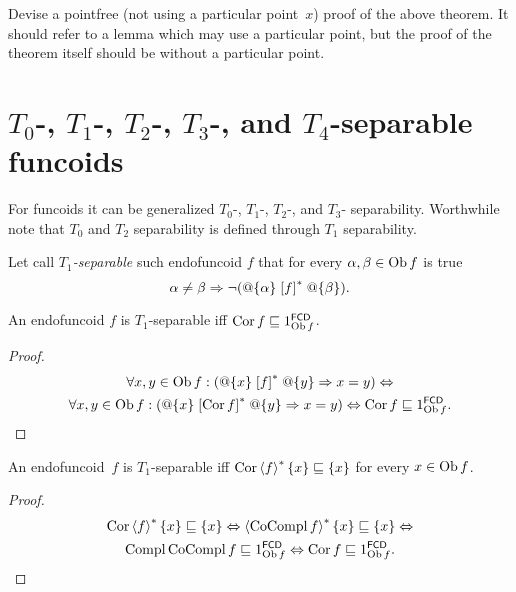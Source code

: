 \begin{problem}
Devise a pointfree (not using a particular point~$x$) proof of the above theorem.
It should refer to a lemma which may use a particular point, but the proof of the
theorem itself should be without a particular point.
\end{problem}

\section{\texorpdfstring{$T_{0}$-, $T_{1}$-, $T_{2}$-, $T_{3}$-, and $T_{4}$-separable
funcoids}%
{T0-, T1-, T2-, and T3-separable funcoids}}

For funcoids it can be generalized $T_{0}$-,
$T_{1}$-, $T_{2}$-, and $T_{3}$- separability. Worthwhile note
that $T_{0}$ and $T_{2}$ separability is defined through $T_{1}$
separability.
\begin{defn}
Let call \emph{$T_{1}$-separable} such endofuncoid $f$ that for
every $\alpha,\beta\in\operatorname{Ob} f$ is true
\[
\alpha\ne\beta\Rightarrow\lnot(@\{\alpha\}\mathrel{\left[f\right]^{\ast}}@\{\beta\}).
\]
\end{defn}
\begin{prop}
An endofuncoid $f$ is $T_{1}$-separable iff $\operatorname{Cor} f\sqsubseteq1_{\operatorname{Ob}
f}^{\mathsf{FCD}}$.\end{prop}
\begin{proof}
~
\begin{multline*}
\forall x,y\in\operatorname{Ob} f:(@\{x\}\mathrel{\left[f\right]^{\ast}}@\{y\}\Rightarrow x=y)\Leftrightarrow\\
\forall x,y\in\operatorname{Ob} f:(@\{x\}\mathrel{\left[\operatorname{Cor} f\right]^{\ast}}@\{y\}\Rightarrow x=y)\Leftrightarrow\operatorname{Cor} f\sqsubseteq1_{\operatorname{Ob} f}^{\mathsf{FCD}}.
\end{multline*}
\end{proof}

\begin{prop}
An endofuncoid~$f$ is $T_{1}$-separable iff $\operatorname{Cor}\left\langle f\right\rangle ^{\ast}\{x\}\sqsubseteq\{x\}$ for every $x\in\operatorname{Ob} f$.
\end{prop}

\begin{proof}
\begin{multline*}
\operatorname{Cor} \left\langle f\right\rangle ^{\ast} \{ x \} \sqsubseteq \{ x \}
\Leftrightarrow \left\langle \operatorname{CoCompl} f\right\rangle ^{\ast} \{ x \} \sqsubseteq \{
x \} \Leftrightarrow \\ \operatorname{Compl} \operatorname{CoCompl} f \sqsubseteq
1^{\mathsf{FCD}}_{\operatorname{Ob} f} \Leftrightarrow \operatorname{Cor} f \sqsubseteq
1^{\mathsf{FCD}}_{\operatorname{Ob} f}.
\end{multline*}
\end{proof}

